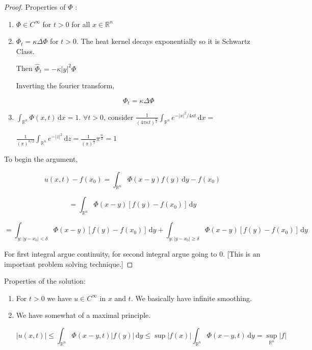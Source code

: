 \documentclass{article}
\theoremstyle{definition}
\begin{document}
\begin{proof}
    Properties of \(\Phi\) :

    \begin{enumerate}
        \item \(\Phi\in C^{\infty}\) for \(t > 0\) for all \(x\in \mathbb{R}^n\) 
        \item \(\Phi_t = \kappa \Delta \Phi\) for \(t > 0\).
        The heat kernel decays exponentially so it is Schwartz Class.

        Then \(\widehat\Phi_t = - \kappa \vert y \vert ^2 \Phi\) 

        Inverting the fourier transform,

        \[
            \Phi_t = \kappa \Delta \Phi
        \]

        \item \(\int_{\mathbb{R} ^n}^{} \Phi(x,t) \,\mathrm{d}x = 1\). \(\forall t > 0\), consider \(\frac{1}{(4\pi \kappa t)^\frac{n}{2}}\int_{\mathbb{R} ^n}^{} e^{- \vert x \vert ^2 / 4 \kappa t} \,\mathrm{d}x =\)
        
        \( \frac{1}{(\pi)^{n / 2}} \int_{\mathbb{R}^n}^{} e^{- \vert z \vert ^2} \,\mathrm{d}z = \frac{1}{(\pi)^\frac{n}{2}}\pi^\frac{n}{2} = 1 \) 

    \end{enumerate}

    To begin the argument,

    \[
        u(x,t) - f(x_0) = \int_{\mathbb{R}^n}^{} \Phi(x-y)f(y) \,\mathrm{d}y - f(x_0) 
    \]

    \[
        = \int_{\mathbb{R}^n}^{} \Phi(x-y) \left[ f(y) - f(x_0) \right]  \,\mathrm{d}y 
    \]

    \[
        = \int_{y : \vert y - x_0 \vert < \delta}^{} \Phi(x-y) [f(y) - f(x_0)] \,\mathrm{d}y + \int_{y : \vert y - x_0 \vert \geq \delta }^{} \Phi(x-y)[f(y)-f(x_0)] \,\mathrm{d}y 
    \]

    For first integral argue continuity, for second integral argue going to \(0\). [This is an important problem solving technique.]

\end{proof}

Properties of the solution:

\begin{enumerate}
    \item For \(t > 0\) we have \(u\in C^{\infty}\) in \(x\) and \(t\). We basically have infinite smoothing.
    \item We have somewhat of a maximal principle.
    
    \[
        \vert u(x,t) \vert \leq \int_{\mathbb{R}^n}^{} \Phi(x-y,t) \vert f(y) \vert  \,\mathrm{d}y \leq \sup \vert f(x) \vert \int_{\mathbb{R}^n}^{} \Phi(x-y,t) \,\mathrm{d}y = \sup_{\mathbb{R}^n} \vert f \vert 
    \]

\end{enumerate}
\end{document}
